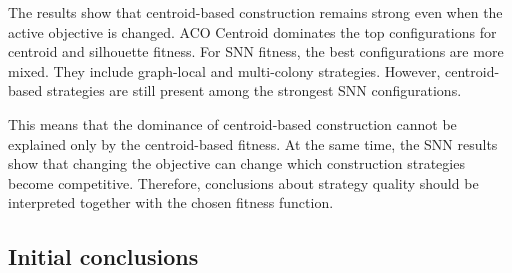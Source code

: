 \documentclass[11pt]{article}
\begin{document}
The results show that centroid-based construction remains strong even when the active objective is changed. ACO Centroid dominates the top configurations for centroid and silhouette fitness. For SNN fitness, the best configurations are more mixed. They include graph-local and multi-colony strategies. However, centroid-based strategies are still present among the strongest SNN configurations.

This means that the dominance of centroid-based construction cannot be explained only by the centroid-based fitness. At the same time, the SNN results show that changing the objective can change which construction strategies become competitive. Therefore, conclusions about strategy quality should be interpreted together with the chosen fitness function.

\subsection{Initial conclusions}
\end{document}
